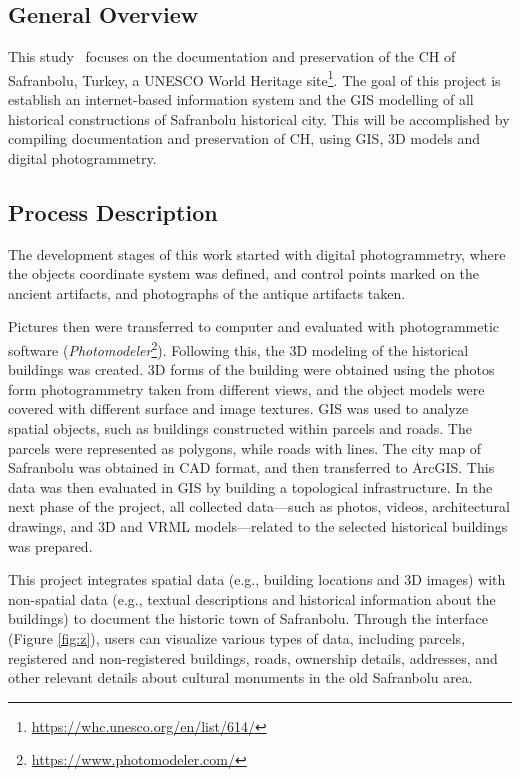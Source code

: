 \subsection*{General Overview}

This study~\cite{arca2018development} focuses on the documentation and preservation of the \gls{CH} of Safranbolu, Turkey, a UNESCO World Heritage site\footnote{\url{https://whc.unesco.org/en/list/614/}}. 
The goal of this project is establish an internet-based information system and the \gls{GIS} modelling of all historical constructions of Safranbolu historical city.
This will be accomplished by compiling documentation and preservation of \gls{CH}, using \gls{GIS}, \gls{3D} models and digital photogrammetry.

\subsection*{Process Description}

The development stages of this work started with digital photogrammetry, where the objects coordinate system was defined, and control points marked on the ancient artifacts, and photographs of the antique artifacts taken.

Pictures then were transferred to computer and evaluated with photogrammetic software (\textit{Photomodeler}\footnote{\url{https://www.photomodeler.com/}}). Following this, the \gls{3D} modeling of the historical buildings was created.
\gls{3D} forms of the building were obtained using the photos form photogrammetry taken from different views, and the object models were covered with different surface and image textures.
\gls{GIS} was used to analyze spatial objects, such as buildings constructed within parcels and roads. The parcels were represented as polygons, while roads with lines.
The city map of Safranbolu was obtained in \gls{CAD} format, and then transferred to ArcGIS. This data was then evaluated in \gls{GIS} by building a topological infrastructure.
In the next phase of the project, all collected data—such as photos, videos, architectural drawings, and \gls{3D} and \gls{VRML} models—related to the selected historical buildings was prepared. 

This project integrates spatial data (e.g., building locations and \gls{3D} images) with non-spatial data (e.g., textual descriptions and historical information about the buildings) to document the historic town of Safranbolu. 
Through the interface (Figure \ref{fig:z}), users can visualize various types of data, including parcels, registered and non-registered buildings, roads, ownership details, addresses, and other relevant details about cultural monuments in the old Safranbolu area.


